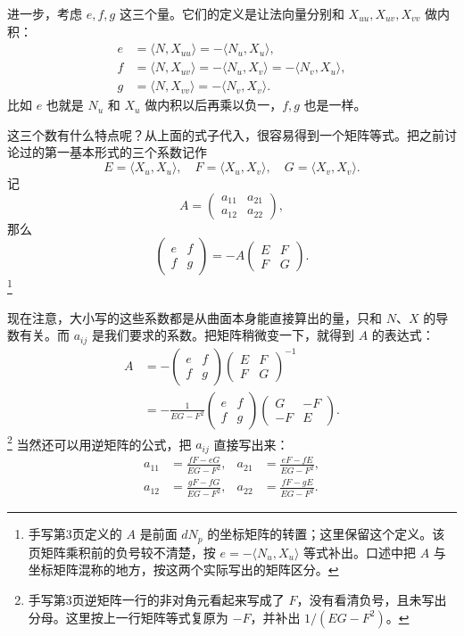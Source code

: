 \documentclass[UTF8,11pt,a4paper]{ctexart}
\newcommand{\ip}[2]{\langle #1,#2\rangle}
\begin{document}
进一步，考虑 $e,f,g$ 这三个量。它们的定义是让法向量分别和 $X_{uu},X_{uv},X_{vv}$ 做内积：
\[
\begin{aligned}
e&=\ip{N}{X_{uu}}=-\ip{N_u}{X_u},\\
f&=\ip{N}{X_{uv}}=-\ip{N_u}{X_v}=-\ip{N_v}{X_u},\\
g&=\ip{N}{X_{vv}}=-\ip{N_v}{X_v}.
\end{aligned}
\]
比如 $e$ 也就是 $N_u$ 和 $X_u$ 做内积以后再乘以负一，$f,g$ 也是一样。

这三个数有什么特点呢？从上面的式子代入，很容易得到一个矩阵等式。把之前讨论过的第一基本形式的三个系数记作
\[
E=\ip{X_u}{X_u},\quad F=\ip{X_u}{X_v},\quad G=\ip{X_v}{X_v}.
\]
记
\[
A=\begin{pmatrix}a_{11}&a_{21}\\a_{12}&a_{22}\end{pmatrix},
\]
那么
\[
\begin{pmatrix}e&f\\f&g\end{pmatrix}
=-A\begin{pmatrix}E&F\\F&G\end{pmatrix}.
\]\footnote{手写第3页定义的 $A$ 是前面 $dN_p$ 的坐标矩阵的转置；这里保留这个定义。该页矩阵乘积前的负号较不清楚，按 $e=-\ip{N_u}{X_u}$ 等式补出。口述中把 $A$ 与坐标矩阵混称的地方，按这两个实际写出的矩阵区分。}

现在注意，大小写的这些系数都是从曲面本身能直接算出的量，只和 $N$、$X$ 的导数有关。而 $a_{ij}$ 是我们要求的系数。把矩阵稍微变一下，就得到 $A$ 的表达式：
\[
\begin{aligned}
A
&=-\begin{pmatrix}e&f\\f&g\end{pmatrix}
\begin{pmatrix}E&F\\F&G\end{pmatrix}^{-1}\\
&=-\frac1{EG-F^2}
\begin{pmatrix}e&f\\f&g\end{pmatrix}
\begin{pmatrix}G&-F\\-F&E\end{pmatrix}.
\end{aligned}
\]\footnote{手写第3页逆矩阵一行的非对角元看起来写成了 $F$，没有看清负号，且未写出分母。这里按上一行矩阵等式复原为 $-F$，并补出 $1/(EG-F^2)$。}
当然还可以用逆矩阵的公式，把 $a_{ij}$ 直接写出来：
\[
\begin{aligned}
a_{11}&=\frac{fF-eG}{EG-F^2},&
a_{21}&=\frac{eF-fE}{EG-F^2},\\
a_{12}&=\frac{gF-fG}{EG-F^2},&
a_{22}&=\frac{fF-gE}{EG-F^2}.
\end{aligned}
\]
\end{document}
